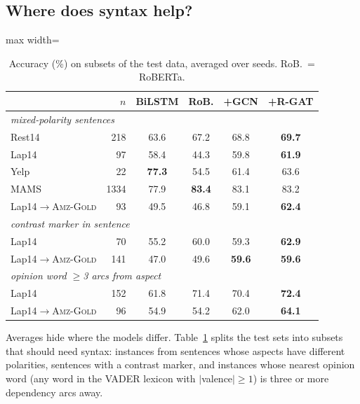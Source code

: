 \documentclass[11pt]{article}
\newcommand{\gold}{\textsc{Amz-Gold}}
\begin{document}
\subsection{Where does syntax help?}
\label{sec:fine}

\begin{table}[t]
\centering
\small
\setlength{\tabcolsep}{3pt}
\begin{adjustbox}{max width=\columnwidth}
\begin{tabular}{lrcccc}
\toprule
 & $n$ & BiLSTM & RoB. & +GCN & +R-GAT \\
\midrule
\multicolumn{6}{l}{\textit{mixed-polarity sentences}} \\
Rest14 & 218 & 63.6 & 67.2 & 68.8 & \textbf{69.7} \\
Lap14 & 97 & 58.4 & 44.3 & 59.8 & \textbf{61.9} \\
Yelp & 22 & \textbf{77.3} & 54.5 & 61.4 & 63.6 \\
MAMS & 1334 & 77.9 & \textbf{83.4} & 83.1 & 83.2 \\
Lap14$\rightarrow$\gold & 93 & 49.5 & 46.8 & 59.1 & \textbf{62.4} \\
\midrule
\multicolumn{6}{l}{\textit{contrast marker in sentence}} \\
Lap14 & 70 & 55.2 & 60.0 & 59.3 & \textbf{62.9} \\
Lap14$\rightarrow$\gold & 141 & 47.0 & 49.6 & \textbf{59.6} & \textbf{59.6} \\
\midrule
\multicolumn{6}{l}{\textit{opinion word $\geq$3 arcs from aspect}} \\
Lap14 & 152 & 61.8 & 71.4 & 70.4 & \textbf{72.4} \\
Lap14$\rightarrow$\gold & 96 & 54.9 & 54.2 & 62.0 & \textbf{64.1} \\
\bottomrule
\end{tabular}
\end{adjustbox}
\caption{Accuracy (\%) on subsets of the test data, averaged over seeds. RoB.\ = RoBERTa.}
\label{tab:fine}
\end{table}

Averages hide where the models differ. Table~\ref{tab:fine} splits the test sets into subsets that should need syntax: instances from sentences whose aspects have different polarities, sentences with a contrast marker, and instances whose nearest opinion word (any word in the VADER lexicon with $|$valence$|\geq 1$) is three or more dependency arcs away.
\end{document}
